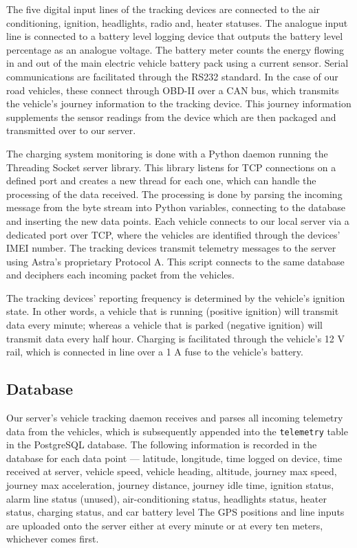
The five digital input lines of the tracking devices are connected to the air conditioning, ignition, headlights, radio and, heater statuses. The analogue input line is connected to a battery level logging device that outputs the battery level percentage as an analogue voltage. The battery meter counts the energy flowing in and out of the main electric vehicle battery pack using a current sensor. Serial communications are facilitated through the RS232 standard. In the case of our road vehicles, these connect through OBD-II over a CAN bus, which transmits the vehicle’s journey information to the tracking device. This journey information supplements the sensor readings from the device which are then packaged and transmitted over to our server.

The charging system monitoring is done with a Python daemon running the Threading Socket server library. This library listens for TCP connections on a defined port and creates a new thread for each one, which can handle the processing of the data received. The processing is done by parsing the incoming message from the byte stream into Python variables, connecting to the database and inserting the new data points. Each vehicle connects to our local server via a dedicated port over TCP, where the vehicles are identified through the devices’ IMEI number. The tracking devices transmit telemetry messages to the server using Astra’s proprietary Protocol A. This script connects to the same database and deciphers each incoming packet from the vehicles. 


The tracking devices’ reporting frequency is determined by the vehicle’s ignition state. In other words, a vehicle that is running (positive ignition) will transmit data every minute; whereas a vehicle that is parked (negative ignition) will transmit data every half hour. Charging is facilitated through the vehicle’s 12 V rail, which is connected in line over a 1 A fuse to the vehicle’s battery.

\subsection{Database}
\label{sec:9:vt:db}
Our server’s vehicle tracking daemon receives and parses all incoming telemetry data from the vehicles, which is subsequently appended into the \texttt{telemetry} table in the PostgreSQL database. The following information is recorded in the database for each data point --- latitude, longitude, time logged on device, time received at server, vehicle speed, vehicle heading, altitude, journey max speed, journey max acceleration, journey distance, journey idle time, ignition status, alarm line status (unused), air-conditioning status, headlights status, heater status, charging status, and car battery level The GPS positions and line inputs are uploaded onto the server either at every minute or at every ten meters, whichever comes first.

